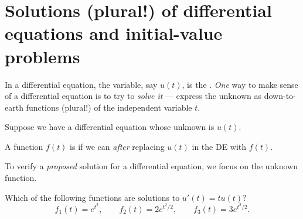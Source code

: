 \documentclass[../main.tex]{subfiles}
\begin{document}
 \section{Solutions (plural!) of differential equations and initial-value problems}

In a differential equation, the  variable, say \(u(t)\), is the . \emph{One} way to make sense of a differential equation is to try to \emph{solve it} --- express the unknown as down-to-earth functions (plural!) of the independent variable \(t\). 

\begin{definition} \label{def:de-solution}
  Suppose we have a differential equation whose unknown is \(u(t)\).

  A function \(f(t)\) is  if we can  \emph{after} replacing \(u(t)\) in the DE with \(f(t)\).  
\end{definition}

\faStar{} To verify a \emph{proposed} solution for a differential equation, we focus on the unknown function.

\begin{example} \label{eg:de-solution-intro}
  Which of the following functions are solutions to  \(u'(t) = t u(t)\)?
  \[
    f_{1}(t) = e^{t^{2}}, \qquad f_{2}(t) = 2e^{t^{2}/2}, \qquad f_{3}(t) = 3e^{t^{2}/2}.
  \]

  \blanks*
\end{example}
\clearpage
\end{document}
